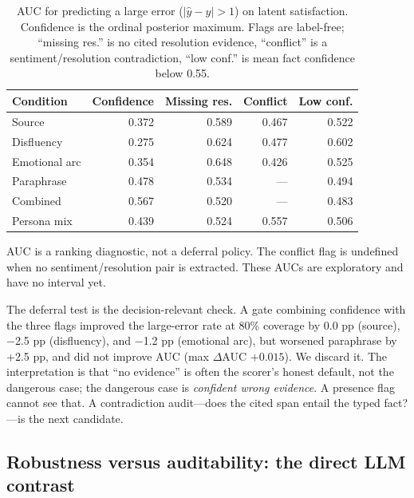 \documentclass[11pt,a4paper]{article}
\begin{document}
\begin{table}[t]
\centering
\caption{AUC for predicting a large error ($|\hat y-y|>1$) on latent satisfaction. Confidence is
the ordinal posterior maximum. Flags are label-free; ``missing res.'' is no cited resolution
evidence, ``conflict'' is a sentiment/resolution contradiction, ``low conf.'' is mean fact
confidence below 0.55.}
\label{tab:audit}
\begin{threeparttable}
\small
\begin{tabular}{@{}lrrrr@{}}
\toprule
Condition & Confidence & Missing res. & Conflict & Low conf. \\
\midrule
Source & 0.372 & 0.589 & 0.467 & 0.522 \\
Disfluency & 0.275 & 0.624 & 0.477 & 0.602 \\
Emotional arc & 0.354 & 0.648 & 0.426 & 0.525 \\
Paraphrase & 0.478 & 0.534 & --- & 0.494 \\
Combined & 0.567 & 0.520 & --- & 0.483 \\
Persona mix & 0.439 & 0.524 & 0.557 & 0.506 \\
\bottomrule
\end{tabular}
\begin{tablenotes}\footnotesize
\item AUC is a ranking diagnostic, not a deferral policy. The conflict flag is undefined when
no sentiment/resolution pair is extracted. These AUCs are exploratory and have no interval yet.
\end{tablenotes}
\end{threeparttable}
\end{table}

The deferral test is the decision-relevant check. A gate combining confidence with the three
flags improved the large-error rate at 80\% coverage by 0.0 pp (source), $-$2.5 pp (disfluency),
and $-$1.2 pp (emotional arc), but worsened paraphrase by +2.5 pp, and did not improve AUC
(max $\Delta$AUC $+0.015$). We discard it. The interpretation is that ``no evidence'' is often
the scorer's honest default, not the dangerous case; the dangerous case is \emph{confident wrong
evidence}. A presence flag cannot see that. A contradiction audit---does the cited span entail
the typed fact?---is the next candidate.

\subsection{Robustness versus auditability: the direct LLM contrast}
\end{document}
